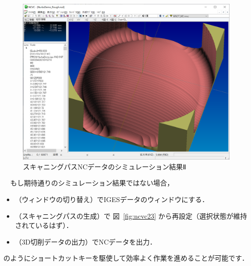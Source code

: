 \begin{figure}[H]
\centering
\includegraphics[scale=0.5]{No2/fig/fig29.png}
\caption{スキャニングパスNCデータのシミュレーション結果Ⅱ}
\label{fig:ncvc29}
\end{figure}

\newpage
　もし期待通りのシミュレーション結果ではない場合，

\begin{itemize}
\item {}（ウィンドウの切り替え）でIGESデータのウィンドウにする．
\item {}（スキャニングパスの生成）で 図~\ref{fig:ncvc23} から再設定（選択状態が維持されているはず）．
\item {}（3D切削データの出力）でNCデータを出力．
\end{itemize}

のようにショートカットキーを駆使して効率よく作業を進めることが可能です．
